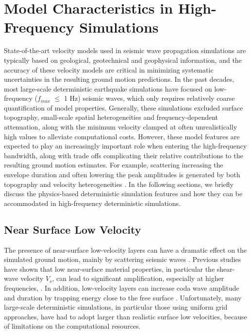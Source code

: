 \section{Model Characteristics in High-Frequency Simulations}

State-of-the-art velocity models used in seismic wave propagation simulations are typically based on geological, geotechnical and geophysical information, and the accuracy of these velocity models are critical in minimizing systematic uncertainties in the resulting ground motion predictions. In the past decades, most large-scale deterministic earthquake simulations have focused on low-frequency ($f_{max}$ $\leqslant$ 1 Hz) seismic waves, which only requires relatively coarse quantification of model properties. Generally, these simulations excluded surface topography, small-scale spatial heterogeneities and frequency-dependent attenuation, along with the minimum velocity clamped at often unrealistically high values to alleviate computational costs. However, these model features are expected to play an increasingly important role when entering the high-frequency bandwidth, along with trade offs complicating their relative contributions to the resulting ground motion estimates. For example, scattering increasing the envelope duration and often lowering the peak amplitudes is generated by both topography and velocity heterogeneities \citet{laiShallowBasinStructure2020}.
In the following sections, we briefly discuss the physics-based deterministic simulation features and how they can be accommodated in high-frequency deterministic simulations.


\subsection{Near Surface Low Velocity}
The presence of near-surface low-velocity layers can have a dramatic effect on the simulated ground motion, mainly by scattering seismic waves . Previous studies have shown that low near-surface material properties, in particular the shear-wave velocity $V_s$, can lead to significant amplification, especially at higher frequencies, \citep{booreSiteAmplificationsGeneric1997,poggiDerivationReferenceShearWave2011}. In addition, low-velocity layers can increase coda wave amplitude and duration by trapping energy close to the free surface \citep{imperatoriBroadbandNearfieldGround2013}. Unfortunately, many large-scale deterministic simulations, in particular those using uniform grid approaches, have had to adopt larger than realistic surface low velocities, because of limitations on the computational resources.

